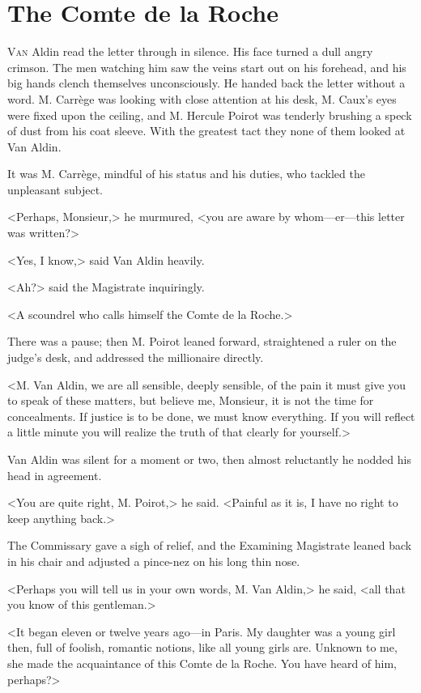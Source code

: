 \chapter{The Comte de la Roche}



\lettrine{V}{an} Aldin read the letter through in silence. His face turned a dull angry crimson. The men watching him saw the veins start out on his forehead, and his big hands clench themselves unconsciously. He handed back the letter without a word. M. Carrège was looking with close attention at his desk, M. Caux's eyes were fixed upon the ceiling, and M. Hercule Poirot was tenderly brushing a speck of dust from his coat sleeve. With the greatest tact they none of them looked at Van Aldin.

It was M. Carrège, mindful of his status and his duties, who tackled the unpleasant subject.

<Perhaps, Monsieur,> he murmured, <you are aware by whom—er—this letter was written?>

<Yes, I know,> said Van Aldin heavily.

<Ah?> said the Magistrate inquiringly.

<A scoundrel who calls himself the Comte de la Roche.>

There was a pause; then M. Poirot leaned forward, straightened a ruler on the judge's desk, and addressed the millionaire directly.

<M. Van Aldin, we are all sensible, deeply sensible, of the pain it must give you to speak of these matters, but believe me, Monsieur, it is not the time for concealments. If justice is to be done, we must know everything. If you will reflect a little minute you will realize the truth of that clearly for yourself.>

Van Aldin was silent for a moment or two, then almost reluctantly he nodded his head in agreement.

<You are quite right, M. Poirot,> he said. <Painful as it is, I have no right to keep anything back.>

The Commissary gave a sigh of relief, and the Examining Magistrate leaned back in his chair and adjusted a pince-nez on his long thin nose.

<Perhaps you will tell us in your own words, M. Van Aldin,> he said, <all that you know of this gentleman.>

<It began eleven or twelve years ago—in Paris. My daughter was a young girl then, full of foolish, romantic notions, like all young girls are. Unknown to me, she made the acquaintance of this Comte de la Roche. You have heard of him, perhaps?>

